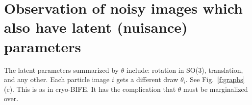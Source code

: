 \documentclass[10pt]{article}
\begin{document}
\section{Observation of noisy images which also have latent (nuisance) parameters}

The latent parameters summarized by $\theta$ include:
rotation in SO(3), translation, and any other.
Each particle image $i$ gets a different draw $\theta_i$.
See Fig.~\ref{f:graphs}(c).
This is as in cryo-BIFE.
It has the complication that $\theta$ must be marginalized over.








\end{document}

